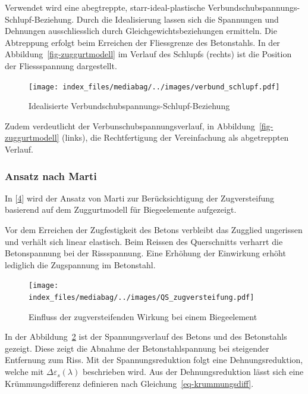 \documentclass[
  12pt,
  letterpaper,
  egregdoesnotlikesansseriftitles]{scrreprt}
\begin{document}
Verwendet wird eine abegtreppte, starr-ideal-plastische
Verbundschubspannungs-Schlupf-Beziehung. Durch die Idealisierung lassen
sich die Spannungen und Dehnungen ausschliesslich durch
Gleichgewichtsbeziehungen ermitteln. Die Abtreppung erfolgt beim
Erreichen der Fliessgrenze des Betonstahls. In der
Abbildung~\ref{fig-zuggurtmodell} im Verlauf des Schlupfs (rechts) ist
die Position der Fliessspannung dargestellt.

\begin{figure}[H]

{\centering \texttt{[image: index\_files/mediabag/../images/verbund\_schlupf.pdf]}

}

\caption{\label{fig-verbund_schlupf}Idealisierte
Verbundschubspannungs-Schlupf-Beziehung}

\end{figure}

Zudem verdeutlicht der Verbunschubspannungsverlauf, in
Abbildung~\ref{fig-zuggurtmodell} (links), die Rechtfertigung der
Vereinfachung als abgetreppten Verlauf.

\hypertarget{ansatz-nach-marti}{%
\subsubsection{Ansatz nach Marti}\label{ansatz-nach-marti}}

In {[}\protect\hyperlink{ref-Spathelf2022}{4}{]} wird der Ansatz von
Marti zur Berücksichtigung der Zugversteifung basierend auf dem
Zuggurtmodell für Biegeelemente aufgezeigt.

Vor dem Erreichen der Zugfestigkeit des Betons verbleibt das Zugglied
ungerissen und verhält sich linear elastisch. Beim Reissen des
Querschnitts verharrt die Betonspannung bei der Rissspannung. Eine
Erhöhung der Einwirkung erhöht lediglich die Zugspannung im Betonstahl.

\begin{figure}[H]

{\centering \texttt{[image: index\_files/mediabag/../images/QS\_zugversteifung.pdf]}

}

\caption{\label{fig-einfluss_zugversteifung}Einfluss der
zugversteifenden Wirkung bei einem Biegeelement}

\end{figure}

In der Abbildung~\ref{fig-einfluss_zugversteifung} ist der
Spannungsverlauf des Betons und des Betonstahls gezeigt. Diese zeigt die
Abnahme der Betonstahlspannung bei steigender Entfernung zum Riss. Mit
der Spannungsreduktion folgt eine Dehnungsreduktion, welche mit
\(\Delta \varepsilon_s (\lambda)\) beschrieben wird. Aus der
Dehnungsreduktion lässt sich eine Krümmungsdifferenz definieren nach
Gleichung~\ref{eq-krummungsdiff}.
\end{document}
